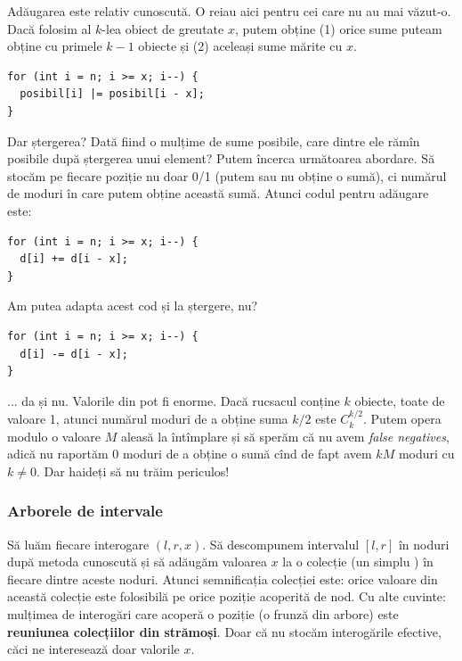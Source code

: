 \documentclass[../main.tex]{subfiles}
\begin{document}
Adăugarea este relativ cunoscută. O reiau aici pentru cei care nu au mai văzut-o. Dacă folosim al $k$-lea obiect de greutate $x$, putem obține (1) orice sume puteam obține cu primele $k-1$ obiecte și (2) aceleași sume mărite cu $x$.

\begin{verbatim}
for (int i = n; i >= x; i--) {
  posibil[i] |= posibil[i - x];
}
\end{verbatim}

Dar ștergerea? Dată fiind o mulțime de sume posibile, care dintre ele rămîn posibile după ștergerea unui element? Putem încerca următoarea abordare. Să stocăm pe fiecare poziție nu doar 0/1 (putem sau nu obține o sumă), ci numărul de moduri în care putem obține această sumă. Atunci codul pentru adăugare este:

\begin{verbatim}
for (int i = n; i >= x; i--) {
  d[i] += d[i - x];
}
\end{verbatim}

Am putea adapta acest cod și la ștergere, nu?

\begin{verbatim}
for (int i = n; i >= x; i--) {
  d[i] -= d[i - x];
}
\end{verbatim}

... da și nu. Valorile din  pot fi enorme. Dacă rucsacul conține $k$ obiecte, toate de valoare 1, atunci numărul moduri de a obține suma $k/2$ este $C_{k}^{k/2}$. Putem opera modulo o valoare $M$ aleasă la întîmplare și să sperăm că nu avem \textit{false negatives}, adică nu raportăm 0 moduri de a obține o sumă cînd de fapt avem $kM$ moduri cu $k \neq 0$. Dar haideți să nu trăim periculos!

\subsubsection*{Arborele de intervale}

Să luăm fiecare interogare $(l, r, x)$. Să descompunem intervalul $[l,r]$ în noduri după metoda cunoscută și să adăugăm valoarea $x$ la o colecție (un simplu ) în fiecare dintre aceste noduri. Atunci semnificația colecției este: orice valoare din această colecție este folosibilă pe orice poziție acoperită de nod. Cu alte cuvinte: mulțimea de interogări care acoperă o poziție (o frunză din arbore) este \textbf{reuniunea colecțiilor din strămoși}. Doar că nu stocăm interogările efective, căci ne interesează doar valorile $x$.
\end{document}
